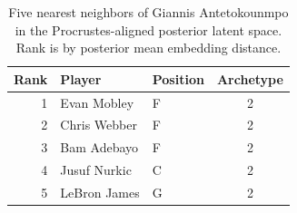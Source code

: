 \begin{table}[htbp]
  \centering\small
  \begin{tabular}{rllc}
    \toprule
    Rank & Player & Position & Archetype \\
    \midrule
    1 & Evan Mobley & F & 2 \\
    2 & Chris Webber & F & 2 \\
    3 & Bam Adebayo & F & 2 \\
    4 & Jusuf Nurkic & C & 2 \\
    5 & LeBron James & G & 2 \\
    \bottomrule
  \end{tabular}
  \caption{Five nearest neighbors of Giannis Antetokounmpo in the Procrustes-aligned posterior latent space. Rank is by posterior mean embedding distance.}
  \label{tab:Giannis_Antetokounmpo_neighbors}
\end{table}

